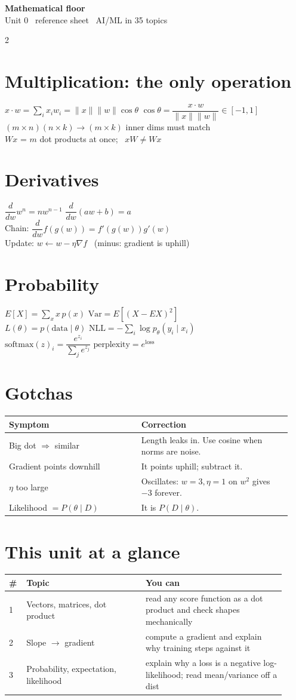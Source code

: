\documentclass[11pt,a4paper]{article}
\newcommand{\sect}[1]{\section*{#1}}
\newcommand{\hd}[2]{\begin{center}{\large\bfseries #1}\\[-0.1em]{\small\color{gray}#2}\end{center}\vspace{-0.6em}}
\begin{document}
\hd{Mathematical floor}{Unit 0 \textperiodcentered\ reference sheet \textperiodcentered\ AI/ML in 35 topics}
\begin{multicols}{2}
\normalsize

\sect{Multiplication: the only operation}
$x\cdot w=\sum_i x_i w_i=\|x\|\|w\|\cos\theta$
$\cos\theta=\dfrac{x\cdot w}{\|x\|\|w\|}\in[-1,1]$
$(m\times n)(n\times k)\to(m\times k)$ \quad inner dims must match\\
$Wx$ = $m$ dot products at once; \ $xW\neq Wx$

\sect{Derivatives}
$\dfrac{d}{dw}w^n=nw^{n-1}$ \quad $\dfrac{d}{dw}(aw+b)=a$\\
Chain: $\dfrac{d}{dw}f(g(w))=f'(g(w))g'(w)$\\
Update: $w\leftarrow w-\eta\nabla f$ \ (minus: gradient is uphill)

\sect{Probability}
$E[X]=\sum_x x\,p(x)$ \quad $\mathrm{Var}=E[(X-EX)^2]$\\
$L(\theta)=p(\text{data}\mid\theta)$ \quad $\mathrm{NLL}=-\sum_i\log p_\theta(y_i\mid x_i)$\\
$\mathrm{softmax}(z)_i=\dfrac{e^{z_i}}{\sum_j e^{z_j}}$ \quad $\text{perplexity}=e^{\mathrm{loss}}$

\sect{Gotchas}
\begin{tabular}{@{}p{0.44\linewidth}p{0.5\linewidth}@{}}
\toprule
Symptom & Correction\\
\midrule
Big dot $\Rightarrow$ similar & Length leaks in. Use cosine when norms are noise.\\
Gradient points downhill & It points uphill; subtract it.\\
$\eta$ too large & Oscillates: $w=3,\eta=1$ on $w^2$ gives $-3$ forever.\\
Likelihood $=P(\theta\mid D)$ & It is $P(D\mid\theta)$.\\
\bottomrule
\end{tabular}

\sect{This unit at a glance}
\begin{tabular}{@{}p{0.05\linewidth}p{0.40\linewidth}p{0.47\linewidth}@{}}
\toprule
\# & Topic & You can\\
\midrule
1 & Vectors, matrices, dot product & read any score function as a dot product and check shapes mechanically\\
2 & Slope $\rightarrow$ gradient & compute a gradient and explain why training steps against it\\
3 & Probability, expectation, likelihood & explain why a loss is a negative log-likelihood; read mean/variance off a dist\\
\bottomrule
\end{tabular}


\end{multicols}
\end{document}
